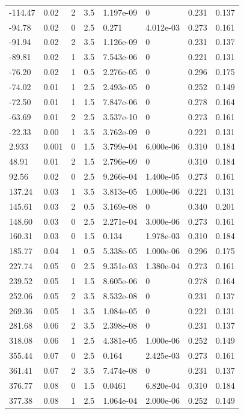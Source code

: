 \documentclass[preview]{standalone}
\begin{document}
{{\begin{tabular}{L{1.2cm}C{1.2cm} C{0.3cm}C{0.5cm} C{1.4cm}C{1.4cm} C{1.4cm}C{1.4cm}}
  -114.47  &  0.02  & 2     & 3.5 &  1.197e-09  & 0  & 0.231 &  0.137   \\ 
  -94.78  &  0.02  & 0     & 2.5 &  0.271  & 4.012e-03  & 0.273 &  0.161   \\ 
  -91.94  &  0.02  & 2     & 3.5 &  1.126e-09  & 0  & 0.231 &  0.137   \\ 
  -89.81  &  0.02  & 1     & 3.5 &  7.543e-06  & 0  & 0.221 &  0.131   \\ 
  -76.20  &  0.02  & 1     & 0.5 &  2.276e-05  & 0  & 0.296 &  0.175   \\ 
  -74.02  &  0.01  & 1     & 2.5 &  2.493e-05  & 0  & 0.252 &  0.149   \\ 
  -72.50  &  0.01  & 1     & 1.5 &  7.847e-06  & 0  & 0.278 &  0.164   \\ 
  -63.69  &  0.01  & 2     & 2.5 &  3.537e-10  & 0  & 0.273 &  0.161   \\ 
  -22.33  &  0.00  & 1     & 3.5 &  3.762e-09  & 0  & 0.221 &  0.131   \\ 
  2.933  &  0.001  & 0     & 1.5 &  3.799e-04  & 6.000e-06  & 0.310 &  0.184   \\ 
  48.91  &  0.01  & 2     & 1.5 &  2.796e-09  & 0  & 0.310 &  0.184   \\ 
  92.56  &  0.02  & 0     & 2.5 &  9.266e-04  & 1.400e-05  & 0.273 &  0.161   \\ 
  137.24  &  0.03  & 1     & 3.5 &  3.813e-05  & 1.000e-06  & 0.221 &  0.131   \\ 
  145.61  &  0.03  & 2     & 0.5 &  3.169e-08  & 0  & 0.340 &  0.201   \\ 
  148.60  &  0.03  & 0     & 2.5 &  2.271e-04  & 3.000e-06  & 0.273 &  0.161   \\ 
  160.31  &  0.03  & 0     & 1.5 &  0.134  & 1.978e-03  & 0.310 &  0.184   \\ 
  185.77  &  0.04  & 1     & 0.5 &  5.338e-05  & 1.000e-06  & 0.296 &  0.175   \\ 
  227.74  &  0.05  & 0     & 2.5 &  9.351e-03  & 1.380e-04  & 0.273 &  0.161   \\ 
  239.52  &  0.05  & 1     & 1.5 &  8.605e-06  & 0  & 0.278 &  0.164   \\ 
  252.06  &  0.05  & 2     & 3.5 &  8.532e-08  & 0  & 0.231 &  0.137   \\ 
  269.36  &  0.05  & 1     & 3.5 &  1.084e-05  & 0  & 0.221 &  0.131   \\ 
  281.68  &  0.06  & 2     & 3.5 &  2.398e-08  & 0  & 0.231 &  0.137   \\ 
  318.08  &  0.06  & 1     & 2.5 &  4.381e-05  & 1.000e-06  & 0.252 &  0.149   \\ 
  355.44  &  0.07  & 0     & 2.5 &  0.164  & 2.425e-03  & 0.273 &  0.161   \\ 
  361.41  &  0.07  & 2     & 3.5 &  7.474e-08  & 0  & 0.231 &  0.137   \\ 
  376.77  &  0.08  & 0     & 1.5 &  0.0461  & 6.820e-04  & 0.310 &  0.184   \\ 
  377.38  &  0.08  & 1     & 2.5 &  1.064e-04  & 2.000e-06  & 0.252 &  0.149   \\ 
\hline 
\end{tabular} 

}}
\end{document}
